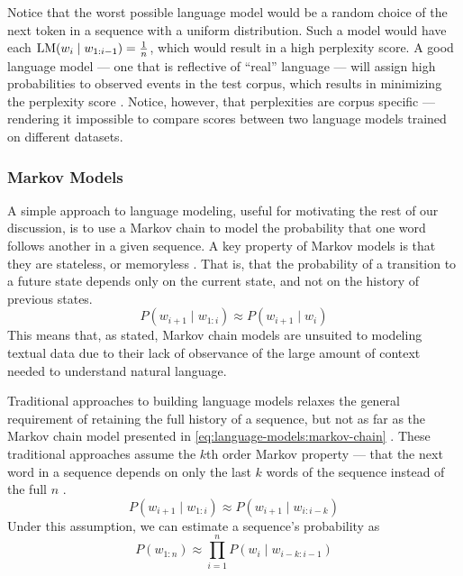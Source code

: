 Notice that the worst possible language model would be a random choice of the next token in a sequence with a uniform distribution.
Such a model would have each $\operatorname{LM}(w_i \mid w_{1:i-1}) = \frac{1}{n}$, which would result in a high perplexity score.
A good language model --- one that is reflective of ``real'' language --- will assign high probabilities to observed events in the test corpus, which results in minimizing the perplexity score \cite{goldberg_2017}.
Notice, however, that perplexities are corpus specific --- rendering it impossible to compare scores between two language models trained on different datasets.

\subsubsection{Markov Models}\label{sec:language-models:markov}

A simple approach to language modeling, useful for motivating the rest of our discussion, is to use a Markov chain to model the probability that one word follows another in a given sequence.
A key property of Markov models is that they are stateless, or memoryless \cite{gagniuc_2017}.
That is, that the probability of a transition to a future state depends only on the current state, and not on the history of previous states.
\begin{equation}
    P(w_{i + 1} \mid w_{1:i}) \approx P(w_{i+1} \mid w_i) \label{eq:language-models:markov-chain}
\end{equation}
This means that, as stated, Markov chain models are unsuited to modeling textual data due to their lack of observance of the large amount of context needed to understand natural language.

Traditional approaches to building language models relaxes the general requirement of retaining the full history of a sequence, but not as far as the Markov chain model presented in \autoref{eq:language-models:markov-chain} \cite{mikolov2012statistical}.
These traditional approaches assume the $k$th order Markov property --- that the next word in a sequence depends on only the last $k$ words of the sequence instead of the full $n$ \cite{goldberg_2017}.
\begin{equation}
    P(w_{i+1} \mid w_{1:i}) \approx P(w_{i+1} \mid w_{i:i-k}) \label{eq:language-models:k-order-markov}
\end{equation}
Under this assumption, we can estimate a sequence's probability as
\begin{equation}
    P(w_{1:n}) \approx \prod_{i=1}^n P(w_i \mid w_{i-k:i-1}) \label{eq:language-models:k-order-sequence-probability}
\end{equation}

